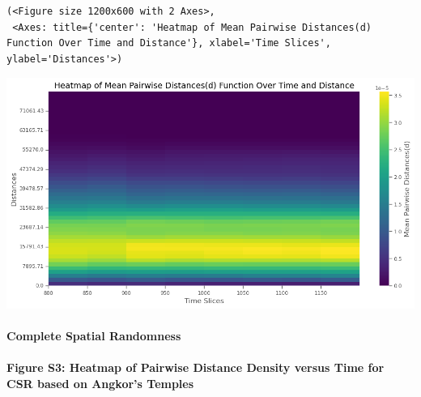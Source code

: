 \documentclass[
  11pt,
  letterpaper,
  DIV=11,
  numbers=noendperiod]{scrartcl}
\let\oldparagraph\paragraph
\renewcommand{\paragraph}[1]{\oldparagraph{#1}\mbox{}}
\begin{document}
\begin{verbatim}
(<Figure size 1200x600 with 2 Axes>,
 <Axes: title={'center': 'Heatmap of Mean Pairwise Distances(d) Function Over Time and Distance'}, xlabel='Time Slices', ylabel='Distances'>)
\end{verbatim}

\includegraphics{analysis_files/figure-pdf/cell-10-output-2.png}

\paragraph{Complete Spatial
Randomness}\label{complete-spatial-randomness}

\paragraph{Figure S3: Heatmap of Pairwise Distance Density versus Time
for CSR based on Angkor's
Temples}\label{figure-s3-heatmap-of-pairwise-distance-density-versus-time-for-csr-based-on-angkors-temples}
\end{document}
